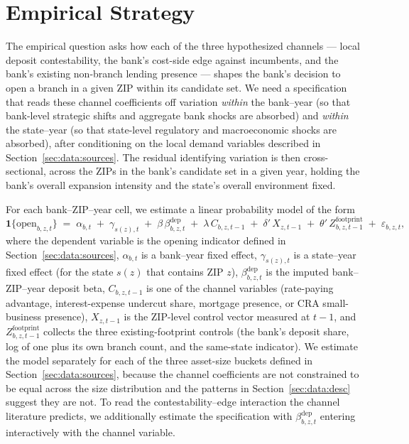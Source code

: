 
\section{Empirical Strategy}
\label{sec:identification}

The empirical question asks how each of the three hypothesized channels --- local deposit contestability, the bank's cost-side edge against incumbents, and the bank's existing non-branch lending presence --- shapes the bank's decision to open a branch in a given ZIP within its candidate set. We need a specification that reads these channel coefficients off variation \emph{within} the bank--year (so that bank-level strategic shifts and aggregate bank shocks are absorbed) and \emph{within} the state--year (so that state-level regulatory and macroeconomic shocks are absorbed), after conditioning on the local demand variables described in Section~\ref{sec:data:sources}. The residual identifying variation is then cross-sectional, across the ZIPs in the bank's candidate set in a given year, holding the bank's overall expansion intensity and the state's overall environment fixed.

For each bank--ZIP--year cell, we estimate a linear probability model of the form
\begin{equation}
\mathbf{1}\{\mathrm{open}_{b,z,t}\}
\;=\;
\alpha_{b,t} \;+\; \gamma_{s(z),t} \;+\;
\beta\,\beta^{\mathrm{dep}}_{b,z,t}
\;+\;
\lambda\,C_{b,z,t-1}
\;+\;
\delta'\,X_{z,t-1}
\;+\;
\theta'\,Z^{\mathrm{footprint}}_{b,z,t-1}
\;+\;
\varepsilon_{b,z,t},
\label{eq:main}
\end{equation}
where the dependent variable is the opening indicator defined in Section~\ref{sec:data:sources}, $\alpha_{b,t}$ is a bank--year fixed effect, $\gamma_{s(z),t}$ is a state--year fixed effect (for the state $s(z)$ that contains ZIP $z$), $\beta^{\mathrm{dep}}_{b,z,t}$ is the imputed bank--ZIP--year deposit beta, $C_{b,z,t-1}$ is one of the channel variables (rate-paying advantage, interest-expense undercut share, mortgage presence, or CRA small-business presence), $X_{z,t-1}$ is the ZIP-level control vector measured at $t-1$, and $Z^{\mathrm{footprint}}_{b,z,t-1}$ collects the three existing-footprint controls (the bank's deposit share, log of one plus its own branch count, and the same-state indicator). We estimate the model separately for each of the three asset-size buckets defined in Section~\ref{sec:data:sources}, because the channel coefficients are not constrained to be equal across the size distribution and the patterns in Section~\ref{sec:data:desc} suggest they are not. To read the contestability--edge interaction the channel literature predicts, we additionally estimate the specification with $\beta^{\mathrm{dep}}_{b,z,t}$ entering interactively with the channel variable.

